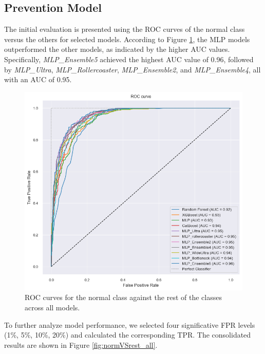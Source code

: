 \subsection{Prevention Model}
The initial evaluation is presented using the ROC curves of the normal class versus the others for selected models.
According to Figure \ref{fig:ROC_normVSrest_allmodels}, the MLP models outperformed the other models, as 
indicated by the higher AUC values.
Specifically, \textit{MLP\_Ensemble5} achieved the highest AUC value of 0.96, followed 
by \textit{MLP\_Ultra}, \textit{MLP\_Rollercoaster}, \textit{MLP\_Ensemble2}, 
and \textit{MLP\_Ensemble4}, all with an AUC of 0.95.

\begin{figure}[H]
    \centering
    \includegraphics[width=\columnwidth]{./images/ROC_normVSrest_allmodels.png}
    \caption{ROC curves for the normal class against the rest of the classes across all models.}
    \label{fig:ROC_normVSrest_allmodels}
\end{figure}
\noindent
To further analyze model performance, we selected four significative FPR levels (1\%, 5\%, 10\%, 20\%) and 
calculated the corresponding TPR. The consolidated results are shown in 
Figure \ref{fig:normVSrest_all}.

